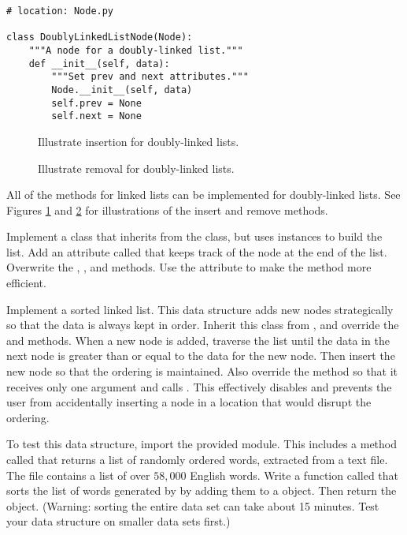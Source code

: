 \begin{lstlisting}
# location: Node.py

class DoublyLinkedListNode(Node):
	"""A node for a doubly-linked list."""
	def __init__(self, data):
		"""Set prev and next attributes."""
		Node.__init__(self, data)
		self.prev = None
		self.next = None
\end{lstlisting}

\begin{figure}
\centering
\caption{Illustrate insertion for doubly-linked lists.}
\label{fig:d_insertion}
\end{figure}

\begin{figure}
\centering
\caption{Illustrate removal for doubly-linked lists.}
\label{fig:d_removal}
\end{figure}


All of the methods for linked lists can be implemented for doubly-linked lists.
See Figures \ref{fig:d_insertion} and \ref{fig:d_removal} for illustrations of the insert and remove methods.

\begin{problem}
Implement a  class that inherits from the  class, but uses  instances to build the list.
Add an attribute called  that keeps track of the node at the end of the list.
Overwrite the , , and  methods.
Use the  attribute to make the  method more efficient.
\end{problem}

\begin{problem}
Implement a sorted linked list.
This data structure adds new nodes strategically so that the data is always kept in order.
Inherit this class from , and override the  and  methods.
When a new node is added, traverse the list until the data in the next node is greater than or equal to the data for the new node.
Then insert the new node so that the ordering is maintained.
Also override the  method so that it receives only one argument and calls . This effectively disables  and prevents the user from accidentally inserting a node in a location that would disrupt the ordering.

To test this data structure, import the provided  module.
This includes a method called  that returns a list of randomly ordered words, extracted from a text file.
The file  contains a list of over $58,000$ English words.
Write a function called  that sorts the list of words generated by  by adding them to a  object.
Then return the object.
(Warning: sorting the entire data set can take about 15 minutes. Test your data structure on smaller data sets first.)
\end{problem}

